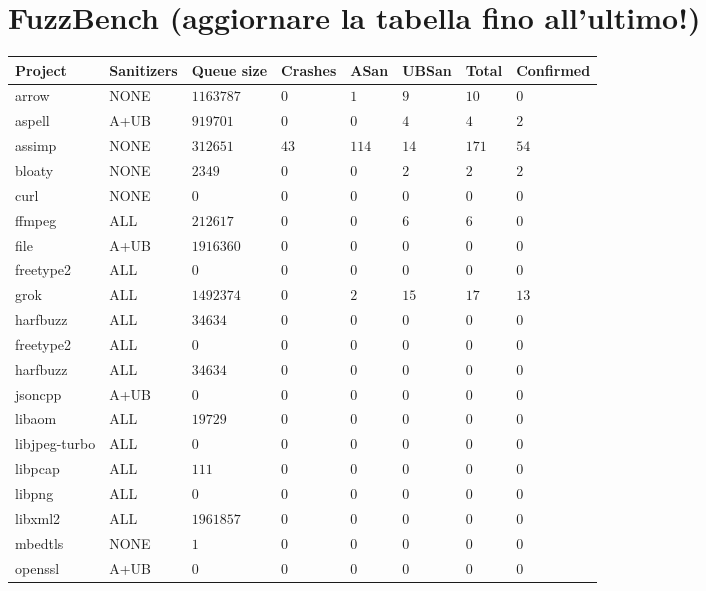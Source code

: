 \newpage
\section{FuzzBench (aggiornare la tabella fino all'ultimo!)}
\begin{adjustbox}{width=\textwidth,center}
\begin{tabular}{|l|l|l|l|l|l|l|l|}
\hline
\textbf{Project} & \textbf{Sanitizers} & \textbf{Queue size} & \textbf{Crashes} & \textbf{ASan} & \textbf{UBSan} & \textbf{Total} & \textbf{Confirmed}  \\ 
\hline
arrow   &NONE   &$1163787$   &$0$   &$1$   &$9$   &$10$   &$0$ \\
aspell   &A+UB   &$919701$   &$0$   &$0$   &$4$   &$4$   &$2$ \\
assimp   &NONE   &$312651$   &$43$   &$114$   &$14$   &$171$   &$54$ \\
bloaty   &NONE   &$2349$   &$0$   &$0$   &$2$   &$2$   &$2$ \\
curl   &NONE   &$0$   &$0$   &$0$   &$0$   &$0$   &$0$ \\
ffmpeg   &ALL   &$212617$   &$0$   &$0$   &$6$   &$6$   &$0$ \\
file   &A+UB   &$1916360$   &$0$   &$0$   &$0$   &$0$   &$0$ \\
freetype2   &ALL   &$0$   &$0$   &$0$   &$0$   &$0$   &$0$ \\
grok   &ALL   &$1492374$   &$0$   &$2$   &$15$   &$17$   &$13$ \\
harfbuzz   &ALL   &$34634$   &$0$   &$0$   &$0$   &$0$   &$0$ \\
freetype2   &ALL   &$0$   &$0$   &$0$   &$0$   &$0$   &$0$ \\
harfbuzz   &ALL   &$34634$   &$0$   &$0$   &$0$   &$0$   &$0$ \\
jsoncpp   &A+UB   &$0$   &$0$   &$0$   &$0$   &$0$   &$0$ \\
libaom   &ALL   &$19729$   &$0$   &$0$   &$0$   &$0$   &$0$ \\
libjpeg-turbo   &ALL   &$0$   &$0$   &$0$   &$0$   &$0$   &$0$ \\
libpcap   &ALL   &$111$   &$0$   &$0$   &$0$   &$0$   &$0$ \\
libpng   &ALL   &$0$   &$0$   &$0$   &$0$   &$0$   &$0$ \\
libxml2   &ALL   &$1961857$   &$0$   &$0$   &$0$   &$0$   &$0$ \\
mbedtls   &NONE   &$1$   &$0$   &$0$   &$0$   &$0$   &$0$ \\
openssl   &A+UB   &$0$   &$0$   &$0$   &$0$   &$0$   &$0$ \\

\end{tabular}
\end{adjustbox}
